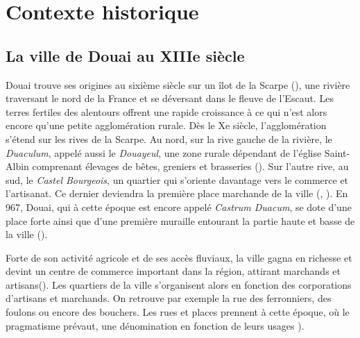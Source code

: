 
\section{Contexte historique}
\subsection{La ville de Douai au XIIIe siècle}

Douai trouve ses origines au sixième siècle sur un îlot de la Scarpe (\cite{mestayer_douai_2016}), une rivière traversant le nord de la France et se déversant dans le fleuve de l'Escaut. Les terres fertiles des alentours offrent une rapide croissance à ce qui n'est alors encore qu'une petite agglomération rurale. Dès le Xe siècle, l'agglomération s'étend sur les rives de la Scarpe. Au nord, sur la rive gauche de la rivière, le \textit{Duaculum}, appelé aussi le \textit{Douayeul}, une zone rurale dépendant de l'église Saint-Albin comprenant élevages de bêtes, greniers et brasseries (\cite{mestayer_douai_2016}). Sur l'autre rive, au sud, le \textit{Castel Bourgeois}, un quartier qui s'oriente davantage vers le commerce et l'artisanat. Ce dernier deviendra la première place marchande de la ville (\cite{officedutourisme_douai_2016}, \cite{netteghem_histoire_2021}). En 967, Douai, qui à cette époque est encore appelé \textit{Castrum Duacum}, se dote d'une place forte ainsi que d'une première muraille entourant la partie haute et basse de la ville (\cite{mestayer_douai_2016}). 

Forte de son activité agricole et de ses accès fluviaux, la ville gagna en richesse et devint un centre de commerce important dans la région, attirant marchands et artisans(\cite{clisant_vie_2003}). Les quartiers de la ville s'organisent alors en fonction des corporations d'artisans et marchands. On retrouve par exemple la rue des ferronniers, des foulons ou encore des bouchers. Les rues et places prennent à cette époque, où le pragmatisme  prévaut, une dénomination en fonction de leurs usages \cite{colin_decouvrez_2001}). 

